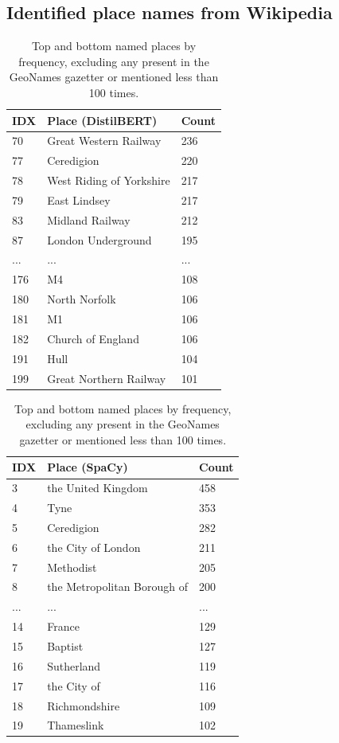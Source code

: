 \documentclass[]{interact}
\theoremstyle{plain}%
\theoremstyle{definition}
\theoremstyle{remark}
\begin{document}
\hypertarget{identified-place-names-from-wikipedia}{%
\subsection{Identified place names from
Wikipedia}\label{identified-place-names-from-wikipedia}}

\begin{table}
\caption{\label{tab:freq}Top and bottom named places by frequency, excluding any present in the GeoNames gazetter or mentioned less than 100 times.}

\centering
\fontsize{9}{11}\selectfont
\begin{tabular}[t]{lll}
\toprule
IDX & Place (DistilBERT) & Count\\
\midrule
70 & Great Western Railway & 236\\
77 & Ceredigion & 220\\
78 & West Riding of Yorkshire & 217\\
79 & East Lindsey & 217\\
83 & Midland Railway & 212\\
87 & London Underground & 195\\
... & ... & ...\\
176 & M4 & 108\\
180 & North Norfolk & 106\\
181 & M1 & 106\\
182 & Church of England & 106\\
191 & Hull & 104\\
199 & Great Northern Railway & 101\\
\bottomrule
\end{tabular}
\centering
\begin{tabular}[t]{lll}
\toprule
IDX & Place (SpaCy) & Count\\
\midrule
3 & the United Kingdom & 458\\
4 & Tyne & 353\\
5 & Ceredigion & 282\\
6 & the City of London & 211\\
7 & Methodist & 205\\
8 & the Metropolitan Borough of & 200\\
... & ... & ...\\
14 & France & 129\\
15 & Baptist & 127\\
16 & Sutherland & 119\\
17 & the City of & 116\\
18 & Richmondshire & 109\\
19 & Thameslink & 102\\
\bottomrule
\end{tabular}
\end{table}
\end{document}
